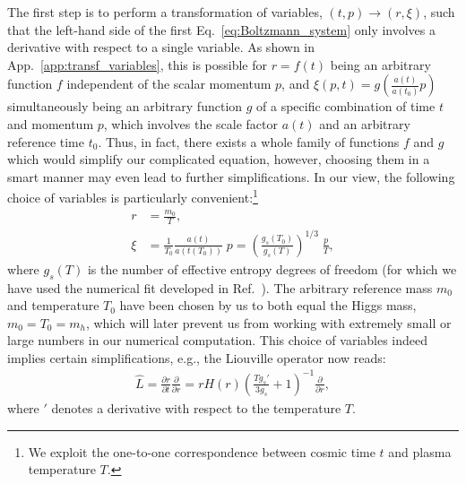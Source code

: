 The first step is to perform a transformation of variables, $(t,p) \to (r,\xi)$, such that the left-hand side of the first Eq.~\eqref{eq:Boltzmann_system} only involves a derivative with respect to a single variable. As shown in App.~\ref{app:transf_variables}, this is possible for $r=f(t)$ being an arbitrary function $f$ independent of the scalar momentum $p$, and $\xi(p,t) = g \left( \frac{a(t)}{a(t_0)} p \right)$ simultaneously being an arbitrary function $g$ of a specific combination of time $t$ and momentum $p$, which involves the scale factor $a(t)$ and an arbitrary reference time $t_0$. Thus, in fact, there exists a whole family of functions $f$ and $g$ which would simplify our complicated equation, however, choosing them in a smart manner may even lead to further simplifications. In our view, the following choice of variables is particularly convenient:\footnote{We exploit the one-to-one correspondence between cosmic time $t$ and plasma temperature $T$.}
\begin{align}\nonumber\label{eq:xi_and_r_definition}
r &= \frac{m_0}{T},\\
\xi &= \frac{1}{T_0}\frac{a(t)}{a(t(T_0))} \; p = \left( \frac{g_{s}(T_0)}{g_{s}(T)} \right)^{1/3}\;\frac{p}{T},
\end{align}
where $g_s(T)$ is the number of effective entropy degrees of freedom (for which we have used the numerical fit developed in Ref.~\cite{Wantz:2009it}). The arbitrary reference mass $m_0$ and temperature $T_0$ have been chosen by us to both equal the Higgs mass, $m_0 = T_0 = m_h$, which will later prevent us from working with extremely small or large numbers in our numerical computation. This choice of variables indeed implies certain simplifications, e.g., the Liouville operator now reads:
\begin{align}
\hat{L} = \frac{\partial r}{\partial t}\frac{\partial}{\partial r}= r H\left(r\right) \left( \frac{T g_s'}{3 g_s} + 1 \right)^{-1}\frac{\partial}{\partial r},\label{eq:liouville_final_form}
\end{align}
where $'$ denotes a derivative with respect to the temperature $T$. 

